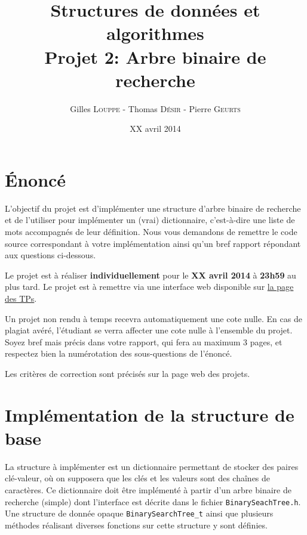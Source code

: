 \documentclass[a4paper,10pt]{article}
\title{
    \textbf{Structures de données et algorithmes}\\
    Projet 2: Arbre binaire de recherche
}
\author{Gilles \textsc{Louppe} - Thomas \textsc{Désir} - Pierre \textsc{Geurts}}
\date{XX avril 2014}
\begin{document}
\maketitle

\section*{\'Enoncé}

L'objectif du projet est d'implémenter une structure d'arbre binaire
de recherche et de l'utiliser pour implémenter un (vrai) dictionnaire,
c'est-à-dire une liste de mots accompagnés de leur définition. Nous
vous demandons de remettre le code source correspondant à votre
implémentation ainsi qu'un bref rapport répondant aux questions
ci-dessous.

Le projet est à réaliser {\bf individuellement} pour le {\bf XX avril
  2014} à {\bf 23h59} au plus tard. Le projet est à
remettre via une interface web disponible sur
\href{http://www.montefiore.ulg.ac.be/~glouppe/2013-2014/students.info0902.php}{la
  page des TPs}.

Un projet non rendu à temps recevra automatiquement une cote nulle. En
cas de plagiat avéré, l'étudiant se verra affecter une cote nulle à
l'ensemble du projet. Soyez bref mais précis dans votre rapport, qui
fera au maximum 3 pages, et respectez bien la numérotation des
sous-questions de l'énoncé.

Les critères de correction sont précisés sur la page web des projets.

\section{Implémentation de la structure de base}

La structure à implémenter est un dictionnaire permettant de stocker
des paires clé-valeur, où on supposera que les clés et les valeurs
sont des chaînes de caractères. Ce dictionnaire doit être implémenté à
partir d'un arbre binaire de recherche (simple) dont l'interface est
décrite dans le fichier \texttt{BinarySeachTree.h}. Une structure de
donnée opaque \texttt{BinarySearchTree\_t} ainsi que plusieurs méthodes
réalisant diverses fonctions sur cette structure y sont définies.
\end{document}
